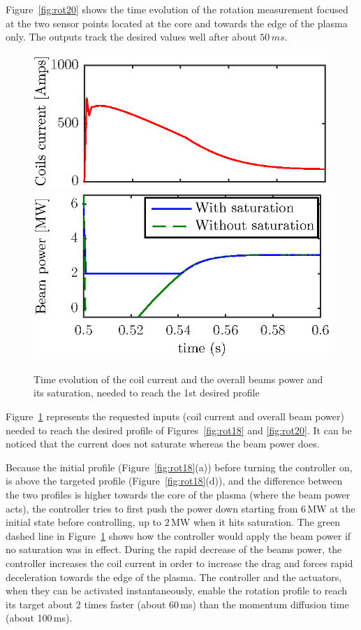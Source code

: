 \documentclass{iopart}
\begin{document}
Figure~\ref{fig:rot20} shows the time evolution of the rotation measurement focused at the two sensor points located at the core and towards the edge of the plasma only. The outputs track the desired values well after about $50\,ms$. 
\begin{figure}
	\centering
	\includegraphics{fig14a}  %
	\includegraphics{fig14b} 
	\caption{Time evolution of the coil current and the overall beams power and its saturation, needed to reach the 1st desired profile }
	\label{fig:rot19}
\end{figure} 

Figure~\ref{fig:rot19} represents the requested inputs (coil current and overall beam power) needed to reach the desired profile of Figures~\ref{fig:rot18} and \ref{fig:rot20}. It can be noticed that the current does not saturate whereas the beam power does.

Because the initial profile (Figure~\ref{fig:rot18}(a)) before turning the controller on, is above the targeted profile  (Figure~\ref{fig:rot18}(d)), and the difference between the two profiles is higher towards the core of the plasma (where the beam power acts), the controller tries to first push the power down starting from $6$\,MW at the initial state before controlling, up to $2$\,MW when it hits saturation. The green dashed line in Figure~\ref{fig:rot19} shows how the controller would apply the beam power if no saturation was in effect. During the rapid decrease of the beams power, the controller increases the coil current in order to increase the drag and forces rapid deceleration towards the edge of the plasma.  
The controller and the actuators, when they can be activated instantaneously, enable the rotation profile to reach its target about 2 times faster (about 60\,ms) than the momentum diffusion time (about 100\,ms).
\end{document}
